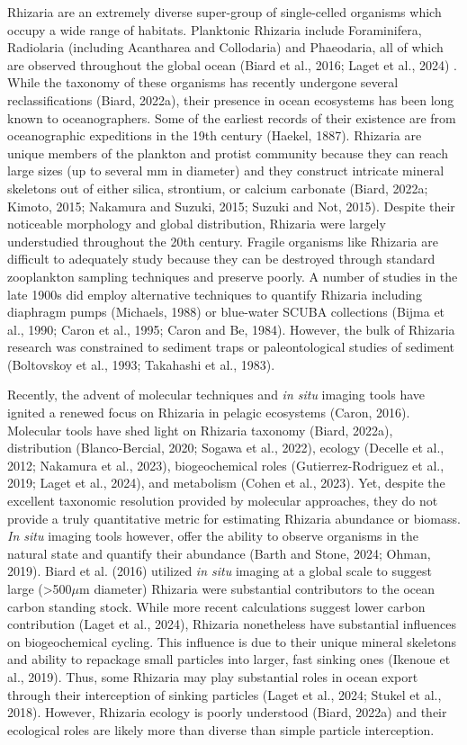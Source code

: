 \documentclass[
]{article}
\begin{document}
Rhizaria are an extremely diverse super-group of single-celled organisms
which occupy a wide range of habitats. Planktonic Rhizaria include
Foraminifera, Radiolaria (including Acantharea and Collodaria) and
Phaeodaria, all of which are observed throughout the global ocean (Biard
et al., 2016; Laget et al., 2024) . While the taxonomy of these
organisms has recently undergone several reclassifications (Biard,
2022a), their presence in ocean ecosystems has been long known to
oceanographers. Some of the earliest records of their existence are from
oceanographic expeditions in the 19th century (Haekel, 1887). Rhizaria
are unique members of the plankton and protist community because they
can reach large sizes (up to several mm in diameter) and they construct
intricate mineral skeletons out of either silica, strontium, or calcium
carbonate (Biard, 2022a; Kimoto, 2015; Nakamura and Suzuki, 2015; Suzuki
and Not, 2015). Despite their noticeable morphology and global
distribution, Rhizaria were largely understudied throughout the 20th
century. Fragile organisms like Rhizaria are difficult to adequately
study because they can be destroyed through standard zooplankton
sampling techniques and preserve poorly. A number of studies in the late
1900s did employ alternative techniques to quantify Rhizaria including
diaphragm pumps (Michaels, 1988) or blue-water SCUBA collections (Bijma
et al., 1990; Caron et al., 1995; Caron and Be, 1984). However, the bulk
of Rhizaria research was constrained to sediment traps or
paleontological studies of sediment (Boltovskoy et al., 1993; Takahashi
et al., 1983).

Recently, the advent of molecular techniques and \emph{in situ} imaging
tools have ignited a renewed focus on Rhizaria in pelagic ecosystems
(Caron, 2016). Molecular tools have shed light on Rhizaria taxonomy
(Biard, 2022a), distribution (Blanco-Bercial, 2020; Sogawa et al.,
2022), ecology (Decelle et al., 2012; Nakamura et al., 2023),
biogeochemical roles (Gutierrez-Rodriguez et al., 2019; Laget et al.,
2024), and metabolism (Cohen et al., 2023). Yet, despite the excellent
taxonomic resolution provided by molecular approaches, they do not
provide a truly quantitative metric for estimating Rhizaria abundance or
biomass. \emph{In situ} imaging tools however, offer the ability to
observe organisms in the natural state and quantify their abundance
(Barth and Stone, 2024; Ohman, 2019). Biard et al. (2016) utilized
\emph{in situ} imaging at a global scale to suggest large
(\textgreater500\(\mu\)m diameter) Rhizaria were substantial
contributors to the ocean carbon standing stock. While more recent
calculations suggest lower carbon contribution (Laget et al., 2024),
Rhizaria nonetheless have substantial influences on biogeochemical
cycling. This influence is due to their unique mineral skeletons and
ability to repackage small particles into larger, fast sinking ones
(Ikenoue et al., 2019). Thus, some Rhizaria may play substantial roles
in ocean export through their interception of sinking particles (Laget
et al., 2024; Stukel et al., 2018). However, Rhizaria ecology is poorly
understood (Biard, 2022a) and their ecological roles are likely more
than diverse than simple particle interception.
\end{document}
